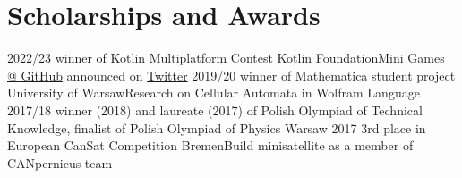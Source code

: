 \documentclass[a4paper]{twentysecondcv} %
\begin{document}
    \vspace{-0.6cm}

    \section{Scholarships and Awards}
    \begin{twenty}
        \twentyitem
        {2022/23}
        {}
        {winner of Kotlin Multiplatform Contest}
        {Kotlin Foundation}{\href{https://github.com/avan1235/mini-games}{Mini Games {\footnotesize @ GitHub}} announced on \href{https://twitter.com/kotlinconf/status/1616430150836445184}{Twitter}}{}
        \twentyitem
        {2019/20}
        {}
        {winner of Mathematica student project}
        {University of Warsaw}{Research on Cellular Automata in Wolfram Language}{}
        \twentyitem
        {2017/18}
        {}
        {winner (2018) and laureate (2017) of Polish Olympiad of Technical Knowledge, finalist of Polish Olympiad of Physics}
        {Warsaw}{}{}
        \twentyitem
        {2017}
        {}
        {3rd place in European CanSat Competition}
        {Bremen}{Build minisatellite as a member of CANpernicus team}{}
    \end{twenty}


%
\end{document}
